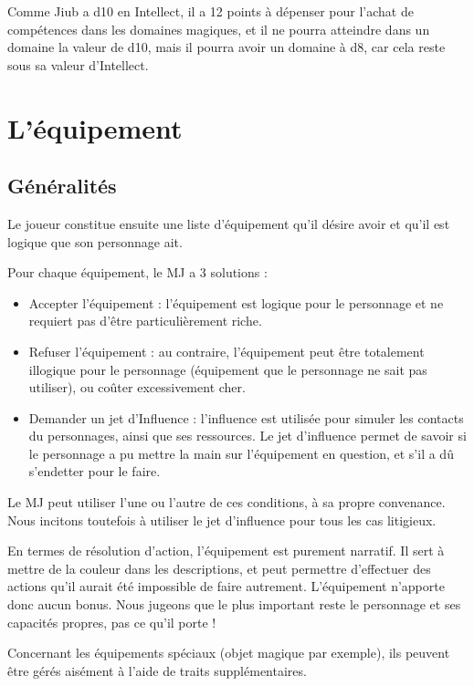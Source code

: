 {Comme Jiub a d10 en Intellect, il a 12 points à dépenser pour l'achat de compétences dans les domaines magiques, et il ne pourra atteindre dans un domaine la valeur de d10, mais il pourra avoir un domaine à d8, car cela reste sous sa valeur d'Intellect.}

\section{L'équipement}

\subsection{Généralités}

Le joueur constitue ensuite une liste d'équipement qu'il désire avoir et qu'il est logique que son personnage ait.

Pour chaque équipement, le MJ a 3 solutions : 

\begin{itemize}
\item Accepter l'équipement : l'équipement est logique pour le personnage et ne requiert pas d'être particulièrement riche. 
\item Refuser l'équipement : au contraire, l'équipement peut être totalement illogique pour le personnage (équipement que le personnage ne sait pas utiliser), ou coûter excessivement cher.
\item Demander un jet d'Influence : l'influence est utilisée pour simuler les contacts du personnages, ainsi que ses ressources. Le jet d'influence permet de savoir si le personnage a pu mettre la main sur l'équipement en question, et s'il a dû s'endetter pour le faire.
\end{itemize}

Le MJ peut utiliser l’une ou l’autre de ces conditions, à sa propre convenance. Nous incitons toutefois à utiliser le jet d’influence pour tous les cas litigieux.

En termes de résolution d’action, l’équipement est purement narratif. Il sert à mettre de la couleur dans les descriptions, et peut permettre d’effectuer des actions qu’il aurait été impossible de faire autrement. L’équipement n’apporte donc aucun bonus. Nous jugeons que le plus important reste le personnage et ses capacités propres, pas ce qu’il porte !

Concernant les équipements spéciaux (objet magique par exemple), ils peuvent être gérés aisément à l’aide de traits supplémentaires.

